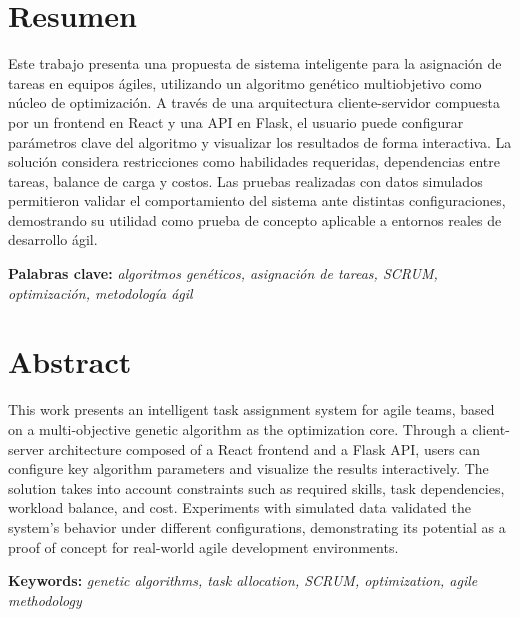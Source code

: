 \newpage
\section*{Resumen}

Este trabajo presenta una propuesta de sistema inteligente para la asignación de tareas en equipos ágiles, utilizando un algoritmo genético multiobjetivo como núcleo de optimización. A través de una arquitectura cliente-servidor compuesta por un frontend en React y una API en Flask, el usuario puede configurar parámetros clave del algoritmo y visualizar los resultados de forma interactiva. La solución considera restricciones como habilidades requeridas, dependencias entre tareas, balance de carga y costos. Las pruebas realizadas con datos simulados permitieron validar el comportamiento del sistema ante distintas configuraciones, demostrando su utilidad como prueba de concepto aplicable a entornos reales de desarrollo ágil.

\vspace{0.5cm}

\textbf{Palabras clave:} \textit{algoritmos genéticos, asignación de tareas, SCRUM, optimización, metodología ágil}

\vspace{1cm}

\section*{Abstract}

This work presents an intelligent task assignment system for agile teams, based on a multi-objective genetic algorithm as the optimization core. Through a client-server architecture composed of a React frontend and a Flask API, users can configure key algorithm parameters and visualize the results interactively. The solution takes into account constraints such as required skills, task dependencies, workload balance, and cost. Experiments with simulated data validated the system's behavior under different configurations, demonstrating its potential as a proof of concept for real-world agile development environments.

\vspace{0.5cm}

\textbf{Keywords:} \textit{genetic algorithms, task allocation, SCRUM, optimization, agile methodology}

\newpage



